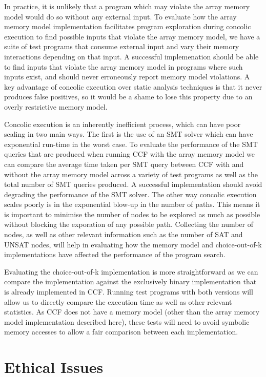 \documentclass[12pt,twoside]{report}
\begin{document}
In practice, it is unlikely that a program which may violate the array memory model would do so without any external input. To evaluate how the array memory model implementation facilitates program exploration during concolic execution to find possible inputs that violate the array memory model, we have a suite of test programs that consume external input and vary their memory interactions depending on that input. A successful implemenation should be able to find inputs that violate the array memory model in programs where such inputs exist, and should never erroneously report memory model violations. A key advantage of concolic execution over static analysis techniques is that it never produces false positives, so it would be a shame to lose this property due to an overly restrictive memory model.

Concolic execution is an inherently inefficient process, which can have poor scaling in two main ways. The first is the use of an SMT solver which can have exponential run-time in the worst case. To evaluate the performance of the SMT queries that are produced when running CCF with the array memory model we can compare the average time taken per SMT query between CCF with and without the array memory model across a variety of test programs as well as the total number of SMT queries produced. A successful implementation should avoid degrading the performance of the SMT solver. The other way concolic execution scales poorly is in the exponential blow-up in the number of paths. This means it is important to minimise the number of nodes to be explored as much as possible without blocking the exporation of any possible path. Collecting the number of nodes, as well as other relevant information such as the number of SAT and UNSAT nodes, will help in evaluating how the memory model and choice-out-of-k implementations have affected the performance of the program search.

Evaluating the choice-out-of-k implementation is more straightforward as we can compare the implementation against the exclusively binary implementation that is already implemented in CCF. Running test programs with both versions will allow us to directly compare the execution time as well as other relevant statistics. As CCF does not have a memory model (other than the array memory model implementation described here), these tests will need to avoid symbolic memory accesses to allow a fair comparison between each implementation.

\chapter{Ethical Issues}
\end{document}
